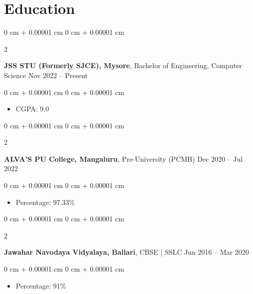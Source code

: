 \documentclass[10pt, letterpaper]{article}
\newenvironment{highlights}{
    \begin{itemize}[
        topsep=0.10 cm,
        parsep=0.10 cm,
        partopsep=0pt,
        itemsep=0pt,
        leftmargin=0 cm + 10pt
    ]
}{
    \end{itemize}
} %
\newenvironment{onecolentry}{
    \begin{adjustwidth}{
        0 cm + 0.00001 cm
    }{
        0 cm + 0.00001 cm
    }
}{
    \end{adjustwidth}
} %
\newenvironment{twocolentry}[2][]{
    \onecolentry
    \def\secondColumn{#2}
    \setcolumnwidth{\fill, 4.5 cm}
    \begin{paracol}{2}
}{
    \switchcolumn \raggedleft \secondColumn
    \end{paracol}
    \endonecolentry
} %
\begin{document}
    \section{Education}

        \begin{twocolentry}{
            Nov 2022 – Present
        }
            \textbf{JSS STU (Formerly SJCE), Mysore}, Bachelor of Engineering, Computer Science\end{twocolentry}

        \vspace{0.10 cm}
        \begin{onecolentry}
            \begin{highlights}
                \item CGPA: 9.0
            \end{highlights}
        \end{onecolentry}

        \vspace{0.2 cm}

        \begin{twocolentry}{
            Dec 2020 – Jul 2022
        }
            \textbf{ALVA'S PU College, Mangaluru}, Pre-University (PCMB)\end{twocolentry}

        \vspace{0.10 cm}
        \begin{onecolentry}
            \begin{highlights}
                \item Percentage: 97.33\%
            \end{highlights}
        \end{onecolentry}

        \vspace{0.2 cm}

        \begin{twocolentry}{
            Jun 2016 – Mar 2020
        }
            \textbf{Jawahar Navodaya Vidyalaya, Ballari}, CBSE | SSLC\end{twocolentry}

        \vspace{0.10 cm}
        \begin{onecolentry}
            \begin{highlights}
                \item Percentage: 91\%
            \end{highlights}
        \end{onecolentry}
\end{document}
